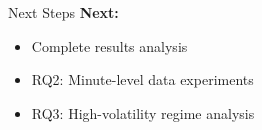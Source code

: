 \documentclass[aspectratio=169]{beamer}
\begin{document}






\begin{frame}{Next Steps}
\textbf{Next:}
\begin{itemize}
\item Complete results analysis
\item RQ2: Minute-level data experiments
\item RQ3: High-volatility regime analysis
\end{itemize}
\end{frame}


\end{document}

